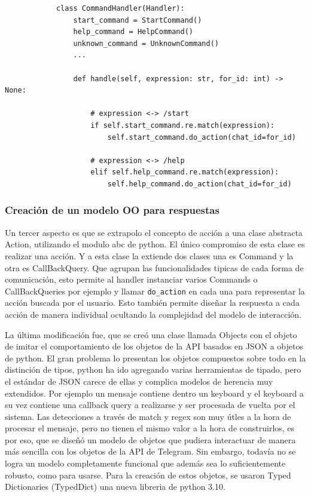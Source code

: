         \begin{verbatim}
            class CommandHandler(Handler):
                start_command = StartCommand()
                help_command = HelpCommand()
                unknown_command = UnknownCommand()
                ...

                def handle(self, expression: str, for_id: int) -> None:

                    # expression <-> /start
                    if self.start_command.re.match(expression):
                        self.start_command.do_action(chat_id=for_id)

                    # expression <-> /help
                    elif self.help_command.re.match(expression):
                        self.help_command.do_action(chat_id=for_id)
        \end{verbatim}

    \subsubsection{Creación de un modelo OO para respuestas}
        \par Un tercer aspecto es que se extrapolo el concepto de acción a una clase abstracta Action, utilizando el modulo abc de python. El único compromiso de esta clase es realizar una acción. Y a esta clase la extiende dos clases una es Command y la otra es CallBackQuery. Que agrupan las funcionalidades tipicas de cada forma de comunicación, esto permite al handler instanciar varios Commands o CallBackQueries por ejemplo y llamar  \texttt{do_action} en cada una para representar la acción buscada por el usuario.
        Esto también permite diseñar la respuesta a cada acción de manera individual ocultando la complejidad del modelo de interacción.


        \par La última modificación fue, que se creó una clase llamada Objects con el objeto de imitar el comportamiento de los objetos de la API basados en JSON a objetos de python. El gran problema lo presentan los objetos compuestos sobre todo en la distinción de tipos, python ha ido agregando varias herramientas de tipado, pero el estándar de JSON carece de ellas y complica modelos de herencia muy extendidos. Por ejemplo un mensaje contiene dentro un keyboard y el keyboard a su vez contiene una callback query a realizarse y ser procesada de vuelta por el sistema. Las detecciones a través de match y regex son muy útles a la hora de procesar el mensaje, pero no tienen el mismo valor a la hora de construirlos, es por eso, que se diseñó un modelo de objetos que pudiera interactuar de manera más sencilla con los objetos de la API de Telegram. Sin embargo, todavía no se logra un modelo completamente funcional que además sea lo suficientemente robusto, como para usarse. Para la creación de estos objetos, se usaron Typed Dictionaries (TypedDict) una nueva libreria de python 3.10.

